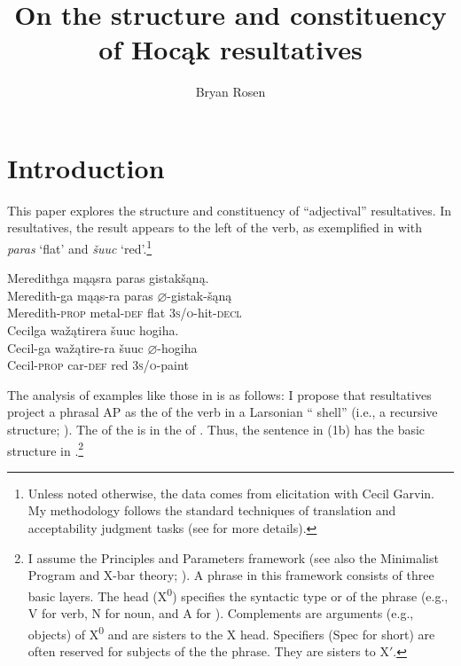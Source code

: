 \documentclass[output=paper]{LSP/langsci}
\author{Bryan Rosen}
\title{On the structure and constituency of {Hocąk} resultatives}
\begin{document}
\section{Introduction}\label{sec:rosen:1}

This paper explores the structure and constituency of  ``adjectival'' resultatives. In  resultatives, the result  appears to the left of the verb, as exemplified in  with \textit{paras} `flat' and \textit{šuuc} `red'.\footnote{Unless noted otherwise, the data comes from  elicitation with Cecil Garvin. My methodology follows the standard techniques of translation and acceptability judgment tasks (see \citealt{Matthewson2004} for more details).}

\ea\label{ex:rosen:1}
\ea
\glll Meredithga mąąsra paras gistakšąną. \\
 Meredith-ga mąąs-ra paras {$\varnothing$}-gistak-šąną\\
Meredith-\textsc{prop} metal-\textsc{def} flat  \textsc{3s/o}-hit-\textsc{decl}\\

\ex 
\glll Cecilga wažątirera šuuc hogiha. \\
Cecil-ga  wažątire-ra šuuc {$\varnothing$}-hogiha \\
Cecil-\textsc{prop} car-\textsc{def} red \textsc{3s/o}-paint\\
\z
\z


The analysis of examples like those in  is as follows: I propose that  resultatives project a phrasal AP as the  of the verb in a Larsonian `` shell'' (i.e., a recursive  structure; \citealt{Larson1988}). The  of the  is in the  of . Thus, the sentence in (1b) has the basic structure in .\footnote{I assume the Principles and Parameters framework (see also the Minimalist Program and X-bar theory; \citealt{Chomsky1995}). A phrase in this framework consists of three basic layers. The head (X\textsuperscript{0}) specifies the syntactic type or  of the phrase (e.g., V for verb, N for noun, and A for ). Complements are arguments (e.g., objects) of X\textsuperscript{0} and are sisters to the X head. Specifiers (Spec for short) are often reserved for subjects of the the phrase. They are sisters to X$'$.}

\begin{exe}
\ex\label{ex:rosen:2}
{\hspace{1em}}\newline
{}
\end{exe}
\end{document}
